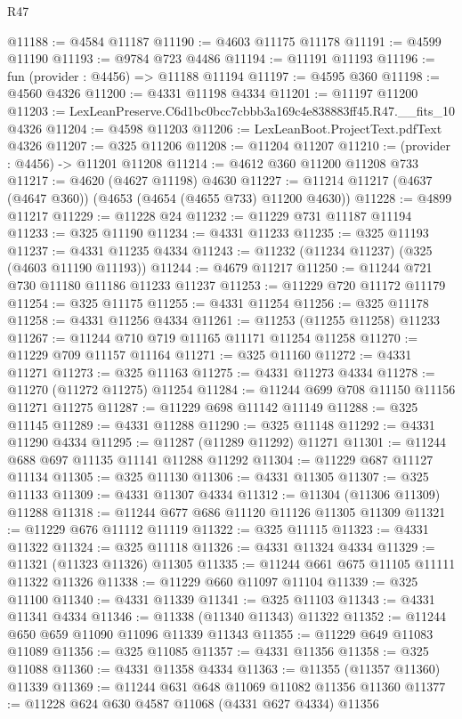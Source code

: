 \begin{lexlean}{R47}
\begin{coremodule}
@11188 := @4584 @11187
@11190 := @4603 @11175 @11178
@11191 := @4599 @11190
@11193 := @9784 @723 @4486
@11194 := @11191 @11193
@11196 := fun (provider : @4456) => @11188 @11194
@11197 := @4595 @360
@11198 := @4560 @4326
@11200 := @4331 @11198 @4334
@11201 := @11197 @11200
@11203 := LexLeanPreserve.C6d1bc0bcc7cbbb3a169c4e838883ff45.R47.__fits_10 @4326
@11204 := @4598 @11203
@11206 := LexLeanBoot.ProjectText.pdfText @4326
@11207 := @325 @11206
@11208 := @11204 @11207
@11210 := (provider : @4456) -> @11201 @11208
@11214 := @4612 @360 @11200 @11208 @733
@11217 := @4620 (@4627 @11198) @4630
@11227 := @11214 @11217 (@4637 (@4647 @360)) (@4653 (@4654 (@4655 @733) @11200 @4630))
@11228 := @4899 @11217
@11229 := @11228 @24
@11232 := @11229 @731 @11187 @11194
@11233 := @325 @11190
@11234 := @4331 @11233
@11235 := @325 @11193
@11237 := @4331 @11235 @4334
@11243 := @11232 (@11234 @11237) (@325 (@4603 @11190 @11193))
@11244 := @4679 @11217
@11250 := @11244 @721 @730 @11180 @11186 @11233 @11237
@11253 := @11229 @720 @11172 @11179
@11254 := @325 @11175
@11255 := @4331 @11254
@11256 := @325 @11178
@11258 := @4331 @11256 @4334
@11261 := @11253 (@11255 @11258) @11233
@11267 := @11244 @710 @719 @11165 @11171 @11254 @11258
@11270 := @11229 @709 @11157 @11164
@11271 := @325 @11160
@11272 := @4331 @11271
@11273 := @325 @11163
@11275 := @4331 @11273 @4334
@11278 := @11270 (@11272 @11275) @11254
@11284 := @11244 @699 @708 @11150 @11156 @11271 @11275
@11287 := @11229 @698 @11142 @11149
@11288 := @325 @11145
@11289 := @4331 @11288
@11290 := @325 @11148
@11292 := @4331 @11290 @4334
@11295 := @11287 (@11289 @11292) @11271
@11301 := @11244 @688 @697 @11135 @11141 @11288 @11292
@11304 := @11229 @687 @11127 @11134
@11305 := @325 @11130
@11306 := @4331 @11305
@11307 := @325 @11133
@11309 := @4331 @11307 @4334
@11312 := @11304 (@11306 @11309) @11288
@11318 := @11244 @677 @686 @11120 @11126 @11305 @11309
@11321 := @11229 @676 @11112 @11119
@11322 := @325 @11115
@11323 := @4331 @11322
@11324 := @325 @11118
@11326 := @4331 @11324 @4334
@11329 := @11321 (@11323 @11326) @11305
@11335 := @11244 @661 @675 @11105 @11111 @11322 @11326
@11338 := @11229 @660 @11097 @11104
@11339 := @325 @11100
@11340 := @4331 @11339
@11341 := @325 @11103
@11343 := @4331 @11341 @4334
@11346 := @11338 (@11340 @11343) @11322
@11352 := @11244 @650 @659 @11090 @11096 @11339 @11343
@11355 := @11229 @649 @11083 @11089
@11356 := @325 @11085
@11357 := @4331 @11356
@11358 := @325 @11088
@11360 := @4331 @11358 @4334
@11363 := @11355 (@11357 @11360) @11339
@11369 := @11244 @631 @648 @11069 @11082 @11356 @11360
@11377 := @11228 @624 @630 @4587 @11068 (@4331 @627 @4334) @11356

\end{coremodule}
\end{lexlean}
